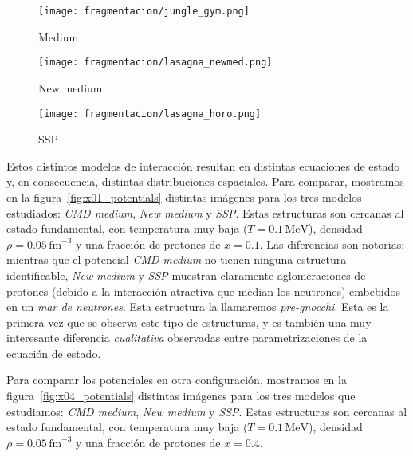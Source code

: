 \begin{figure*}
  \begin{subfigure}{.3\linewidth}
    \texttt{[image: fragmentacion/jungle\_gym.png]}
    \caption{Medium}
  \end{subfigure}
  \begin{subfigure}{.3\linewidth}
    \texttt{[image: fragmentacion/lasagna\_newmed.png]}
    \caption{New medium}
  \end{subfigure}
  \begin{subfigure}{.3\linewidth}
    \texttt{[image: fragmentacion/lasagna\_horo.png]}
    \caption{SSP}
  \end{subfigure}
  \caption{Imágenes de configuraciones para distintas parametrizaciones de la interacción nuclear, todas con las mismas condiciones termodinámicas: $x = 0.4$, $\rho = 0.05\,\text{fm}^{-3}$ y $T = 0.1\,\text{MeV}$.
    Las diferencias cualitativas entre el potencial tipo medio de CMD y las otras dos parametrizaciones (New Medium y SSP) son evidentes.
    Mientras que el potencial CMD muestra una estructura de tipo \emph{jungle gym}, tanto New Medium como SSP muestra \emph{lasagna} que son ligeramente diferentes entre sí.}
\label{fig:x04_potentials}
\end{figure*}


Estos distintos modelos de interacción resultan en distintas ecuaciones de estado y, en consecuencia, distintas distribuciones espaciales.
Para comparar, mostramos en la figura~\ref{fig:x01_potentials} distintas imágenes para los tres modelos estudiados: \emph{CMD medium}, \emph{New medium} y \emph{SSP}.
Estas estructuras son cercanas al estado fundamental, con temperatura muy baja ($T = 0.1\,\text{MeV}$), densidad $\rho = 0.05\,\text{fm}^{-3}$ y una fracción de protones de $x = 0.1$.
Las diferencias son notorias: mientras que el potencial \emph{CMD medium} no tienen ninguna estructura identificable, \emph{New medium} y \emph{SSP} muestran claramente aglomeraciones de protones (debido a la interacción atractiva que median los neutrones) embebidos en un \emph{mar de neutrones}.
Esta estructura la llamaremos \emph{pre-gnocchi}.
Esta es la primera vez que se observa este tipo de estructuras, y es también una muy interesante diferencia \emph{cualitativa} observadas entre parametrizaciones de la ecuación de estado.

Para comparar los potenciales en otra configuración, mostramos en la figura~\ref{fig:x04_potentials} distintas imágenes para los tres modelos que estudiamos: \emph{CMD medium}, \emph{New medium} y \emph{SSP}.
Estas estructuras son cercanas al estado fundamental, con temperatura muy baja ($T = 0.1\,\text{MeV}$), densidad $\rho = 0.05\,\text{fm}^{-3}$ y una fracción de protones de $x = 0.4$.

